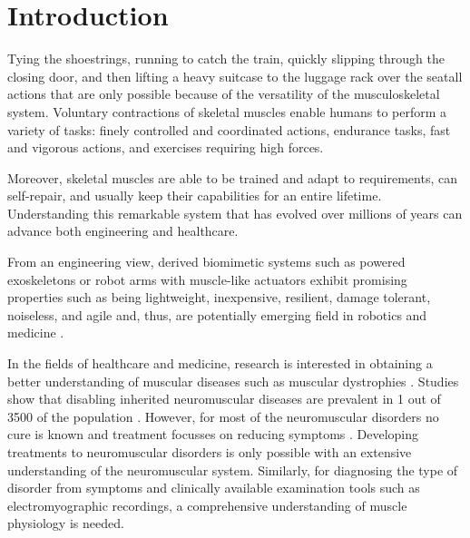\chapter{Introduction}\label{chap:introduction}




Tying the shoestrings, running to catch the train, quickly slipping through the closing door, and then lifting a heavy suitcase to the luggage rack over the seat\textemdash all actions that are only possible because of the versatility of the musculoskeletal system.
Voluntary contractions of skeletal muscles enable humans to perform a variety of tasks: finely controlled and coordinated actions, endurance tasks, fast and vigorous actions, and exercises requiring high forces.

Moreover, skeletal muscles are able to be trained and adapt to requirements, can self-repair, and usually keep their capabilities for an entire lifetime. Understanding this remarkable system that has evolved over millions of years can advance both engineering and healthcare.

From an engineering view, derived biomimetic systems such as powered exoskeletons or robot arms with muscle-like actuators exhibit promising properties such as being lightweight, inexpensive, resilient, damage tolerant, noiseless, and agile and, thus, are potentially emerging field in robotics and medicine \cite{BarCohen2003,BarCohen2004Electroactivepolymer,Mirvakili2018}.

In the fields of healthcare and medicine, research is interested in obtaining a better understanding of muscular diseases such as muscular dystrophies \cite{Emery2002}. Studies show that disabling inherited neuromuscular diseases are prevalent in 1 out of 3500 of the population \cite{Emery1991}. However, for most of the neuromuscular disorders no cure is known and treatment focusses on reducing symptoms \cite{Emery2002,Heidlauf2015Diss}. Developing treatments to neuromuscular disorders is only possible with an extensive understanding of the neuromuscular system. Similarly, for diagnosing the type of disorder from symptoms and clinically available examination tools such as electromyographic recordings, a comprehensive understanding of muscle physiology is needed.

